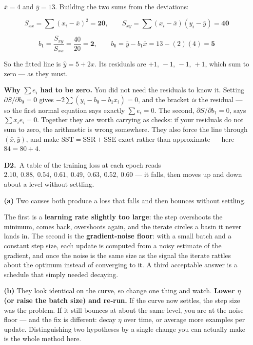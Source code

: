 \documentclass[10pt,a4paper]{article}
\newcommand{\sol}[1]{\textbf{#1}}
\begin{document}
\vspace{2pt}

$\bar x = 4$ and $\bar y = 13$. Building the two sums from the deviations:

\[ S_{xx} = \sum (x_i-\bar x)^2 = \sol{20}, \qquad S_{xy} = \sum (x_i-\bar x)(y_i-\bar y) = \sol{40} \]

\[ b_1 = \frac{S_{xy}}{S_{xx}} = \frac{40}{20} = \sol{2}, \qquad b_0 = \bar y - b_1\bar x = 13 - (2)(4) = \sol{5} \]

So the fitted line is $\hat y = 5 + 2 x$. Its residuals are $+1,\,-1,\,-1,\,+1$, which sum to zero --- as they must.

\vspace{2pt}

\textbf{Why $\sum e_i$ had to be zero.} You did not need the residuals to know it. Setting $\partial S/\partial b_0 = 0$ gives $-2\sum(y_i - b_0 - b_1x_i) = 0$, and the bracket \emph{is} the residual --- so the first normal equation says exactly $\sum e_i = 0$. The second, $\partial S/\partial b_1 = 0$, says $\sum x_ie_i = 0$. Together they are worth carrying as checks: if your residuals do not sum to zero, the arithmetic is wrong somewhere. They also force the line through $(\bar x, \bar y)$, and make $\mathrm{SST} = \mathrm{SSR} + \mathrm{SSE}$ exact rather than approximate --- here $84 = 80 + 4$.

\vspace{6pt}

\textbf{D2.}\ A table of the training loss at each epoch reads $2.10,\ 0.88,\ 0.54,\ 0.61,\ 0.49,\ 0.63,\ 0.52,\ 0.60$ --- it falls, then moves up and down about a level without settling.

\vspace{2pt}

\textbf{(a)} Two causes both produce a loss that falls and then bounces without settling.\par\vspace{1mm}The first is a \textbf{learning rate slightly too large}: the step overshoots the minimum, comes back, overshoots again, and the iterate circles a basin it never lands in. The second is the \textbf{gradient-noise floor}: with a small batch and a constant step size, each update is computed from a noisy estimate of the gradient, and once the noise is the same size as the signal the iterate rattles about the optimum instead of converging to it. A third acceptable answer is a schedule that simply needed decaying.\par\vspace{1mm}\textbf{(b)} They look identical on the curve, so change one thing and watch. \textbf{Lower $\eta$ (or raise the batch size) and re-run.} If the curve now settles, the step size was the problem. If it still bounces at about the same level, you are at the noise floor --- and the fix is different: decay $\eta$ over time, or average more examples per update. Distinguishing two hypotheses by a single change you can actually make is the whole method here.
\end{document}
